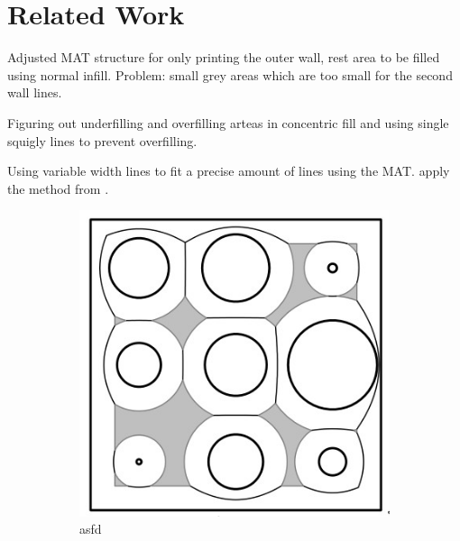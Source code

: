 \section{Related Work}
Adjusted MAT structure for only printing the outer wall, rest area to be filled using normal infill. \cite{Moesen2011}
Problem: small grey areas which are too small for the second wall lines.

Figuring out underfilling and overfilling arteas in concentric fill and using single squigly lines to prevent overfilling. \cite{Jin2017}

Using variable width lines to fit a precise amount of lines using the MAT.
\cite{Ding2016a} apply the method from \cite{kao1998optimal}.

\begin{figure}
\begin{subfigure}{0.45\columnwidth}
\includegraphics[width=\columnwidth]{sources/related_work/moessen.jpg}
\caption{asfd}
\label{moessen}
\end{subfigure}
\begin{subfigure}{0.45\columnwidth}

\end{subfigure}
\end{figure}
